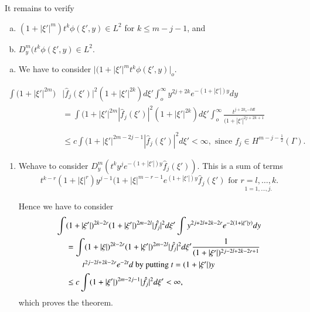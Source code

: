 It remains to verify
\begin{enumerate} [(a)]
\item $( 1 + |\xi' |^m) t^k \phi (\xi' , y) \in L^2$ for $k
  \leq m - j -1$, and 
\item $D^m_y (t^k \phi (\xi' , y) \in L^2$. 
\end{enumerate}
\begin{enumerate}[(a)]
\item We have to consider $\Big | (1 + | \xi' |^m t^k \phi (\xi' , y)
  \Big |_o$.
\end{enumerate}
\begin{align*}
 \int \Big(1 + |\xi'|^{2m}\Big) & \Big| \hat{f}_j (\xi' ) \Big|^2 (1 +
  |\xi'|^{2k}) d \xi' \int^\infty_o y^{2j + 2k} e^{-(1+ |\xi'|)y} dy\\ 
  &= \int (1 + | \xi' |^{2m} | \hat{f}_j (\xi') |^2 (1+|\xi'|^{2k}) d
  \xi' \int^\infty_o \frac{t^{j+2k_e {-t}dt}}{(1 + |\xi' |^{2j + 2k +
      1}}\\ 
  & \tag*{by putting  $(1 + | \xi' |) y = t$.}\\ 
  & \leq c \int ( 1 + |\xi'|^{2m-2j-1} | \hat{f}_j ( \xi') |^2 d \xi' <
  \infty, \text { since } f_j \in H^{m - j - \frac{1}{2}}
(\Gamma).  
\end{align*}
\begin{enumerate}
\renewcommand{\theenumi}{\alph{enumi}}
\renewcommand{\labelenumi}{\theenumi)}
\setcounter{enumi}{1}
\item We\pageoriginale have to consider $D^m_y (t^k y^j e^{-(1 + |\xi'|)y} \hat{f}_j
  (\xi'))$. This is a sum of terms 
  $$
  t^{k-r}(1 + | \xi |^r) y^{j-1 }(1 + |\xi|^{m-r-1} e^{(1 + |\xi'|)y}
  \hat{f}_j (\xi') \text { for } \underset{1 = 1, \ldots , j. }{r = l,
    \ldots, k}.  
  $$
  
  Hence we have to consider
  \begin{align*}
    \int & (1 + |\xi'|)^{2k-2r} (1 + | \xi'|)^{2m-2l} | \hat{f}_j |^2
    d\xi' \int y^{2j + 2l + 2k - 2r} e^{-2 (1 + | \xi' | y)} dy\\ 
    & = \int (1 + | \xi |)^{2k - 2r}(1 + |\xi'| )^{2m - 2l} |\hat{f}_j |^2 d
    \xi' \frac{1}{(1 + | \xi' |)^{2j-2l+2k-2r+1}} \\ 
    &\tag*{$t^{2j-2l+2k-2r} e^{-2t}d$ by putting $t = (1 + |\xi'| ) y$}\\
    & \leq c \int (1 + | \xi'|)^{2m-2j-1} | \hat{f}_j |^2 d \xi' < \infty, 
  \end{align*}
  which proves the theorem. 
\end{enumerate}
